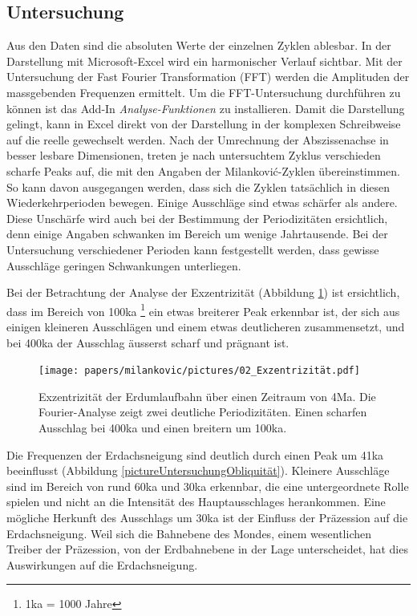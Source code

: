 \subsection{Untersuchung
\label{milankovic:subsection:Untersuchung}}
Aus den Daten sind die absoluten Werte der einzelnen Zyklen ablesbar.
In der Darstellung mit Microsoft-Excel wird ein harmonischer Verlauf sichtbar.
%
Mit der Untersuchung der Fast Fourier Transformation (FFT) werden die Amplituden der massgebenden Frequenzen ermittelt.
Um die FFT-Untersuchung durchführen zu können ist das Add-In
{\em Analyse-Funktionen}
%
zu installieren.
Damit die Darstellung gelingt, kann in Excel direkt von der Darstellung in der komplexen Schreibweise auf die reelle gewechselt werden.
Nach der Umrechnung der Abszissenachse in besser lesbare Dimensionen, treten je nach untersuchtem Zyklus verschieden scharfe Peaks auf, die mit den Angaben der Milankovi\'c-Zyklen übereinstimmen.
So kann davon ausgegangen werden, dass sich die Zyklen tatsächlich in diesen Wiederkehrperioden bewegen.
Einige Ausschläge sind etwas schärfer als andere.
Diese Unschärfe wird auch bei der Bestimmung der Periodizitäten ersichtlich, denn einige Angaben schwanken im Bereich um wenige Jahrtausende.
Bei der Untersuchung verschiedener Perioden kann festgestellt werden, dass gewisse Ausschläge geringen Schwankungen unterliegen.

Bei der Betrachtung der Analyse der Exzentrizität
(Abbildung \ref{pictureUntersuchungExzentrizität})
ist ersichtlich, dass im Bereich von 100ka
\footnote{1ka = 1000 Jahre}
ein etwas breiterer Peak erkennbar ist, der sich aus einigen kleineren Ausschlägen und einem etwas deutlicheren zusammensetzt, und bei 400ka der Ausschlag äusserst scharf und prägnant ist.

\begin{figure}
	\centering
	\texttt{[image: papers/milankovic/pictures/02\_Exzentrizität.pdf]}
	\caption{Exzentrizität der Erdumlaufbahn über einen Zeitraum von 4Ma.
	Die Fourier-Analyse zeigt zwei deutliche Periodizitäten. 
	Einen scharfen Ausschlag bei 400ka und einen breitern um 100ka.
	\label{pictureUntersuchungExzentrizität}}
\end{figure}

Die Frequenzen der Erdachsneigung sind deutlich durch einen Peak um 41ka beeinflusst
	(Abbildung \ref{pictureUntersuchungObliquität}).
Kleinere Ausschläge sind im Bereich von rund 60ka und 30ka erkennbar, die eine untergeordnete Rolle spielen und nicht an die Intensität des Hauptausschlages herankommen.
Eine mögliche Herkunft des Ausschlags um 30ka ist der Einfluss der Präzession auf die Erdachsneigung. 
Weil sich die Bahnebene des Mondes, einem wesentlichen Treiber der Präzession, von der Erdbahnebene in der Lage unterscheidet, hat dies Auswirkungen auf die Erdachsneigung.

